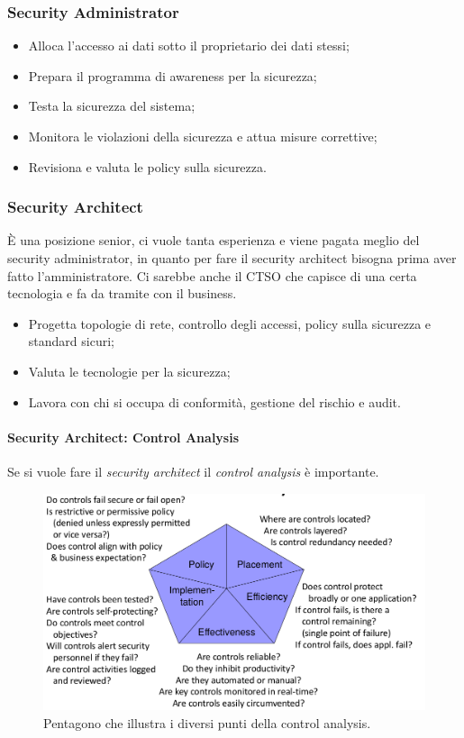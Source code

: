 \subsubsection{Security Administrator}

\begin{itemize}
\item Alloca l'accesso ai dati sotto il proprietario dei dati stessi;
\item Prepara il programma di awareness per la sicurezza;
\item Testa la sicurezza del sistema;
\item Monitora le violazioni della sicurezza e attua misure correttive;
\item Revisiona e valuta le policy sulla sicurezza.
\end{itemize}

\subsubsection{Security Architect}

È una posizione senior, ci vuole tanta esperienza e viene pagata meglio del 
security administrator, in quanto per fare il security architect bisogna 
prima aver fatto l'amministratore. 
Ci sarebbe anche il CTSO che capisce di una certa tecnologia e fa da tramite 
con il business.

\begin{itemize}
\item Progetta topologie di rete, controllo degli accessi, policy sulla sicurezza 
e standard sicuri;
\item Valuta le tecnologie per la sicurezza;
\item Lavora con chi si occupa di conformità, gestione del rischio e audit. 
\end{itemize}

\paragraph{Security Architect: Control Analysis}

Se si vuole fare il \textit{security architect} il \textit{control analysis} è 
importante.

\begin{figure}[h!]
        \begin{center}
                \includegraphics[scale=0.6]{res/img/penta}
        \end{center}
        \caption{Pentagono che illustra i diversi punti della control analysis.}
\end{figure}

